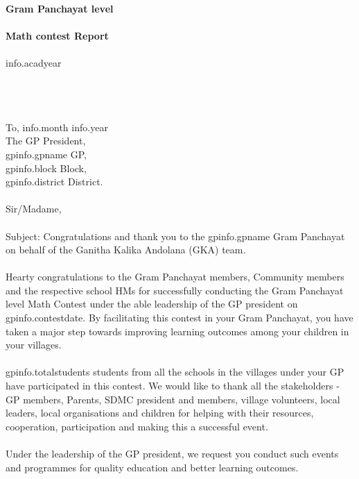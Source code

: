 \documentclass[12pt]{article}
\begin{document}
\begin{titlepage}
    \thispagestyle{title}
    \begin{center}
    \vspace*{10.5cm}
     \textbf{\huge Gram Panchayat level} \\~\\
        \textbf{\huge Math contest Report} \\~\\
	    \Large{{info.acadyear}}
    \end{center}
\end{titlepage}
\pagebreak

\thispagestyle{plain}
{
\setlength{\parindent}{0in}
~\\~\\~\\
To, \hfill  {{info.month}} {{info.year}} \\ [2ex]
The GP President,\\ [1ex]
{{gpinfo.gpname}} GP,\\ [1ex]
{{gpinfo.block}} Block,\\ [1ex]
{{gpinfo.district}} District.
\\~\\ [2ex]
Sir/Madame,
\\~\\
Subject: Congratulations and thank you to the {{gpinfo.gpname}} Gram Panchayat on behalf of the Ganitha Kalika Andolana (GKA) team.
\\~\\
Hearty congratulations to the Gram Panchayat members, Community members and the respective school HMs for successfully conducting the Gram Panchayat level Math Contest under the able leadership of the GP president on {{gpinfo.contestdate}}. By facilitating this contest in your Gram Panchayat, you have taken a major step towards improving learning outcomes among your children in your villages.
\\~\\
{{gpinfo.totalstudents}} students from all the schools in the villages under your GP have participated in this contest. We would like to thank all the stakeholders - GP members, Parents, SDMC president and members, village volunteers, local leaders, local organisations and children for helping with their resources, cooperation, participation and making this a successful event.
\\~\\
Under the leadership of the GP president, we request you conduct such events and programmes for quality education and better learning outcomes.
}
\end{document}
